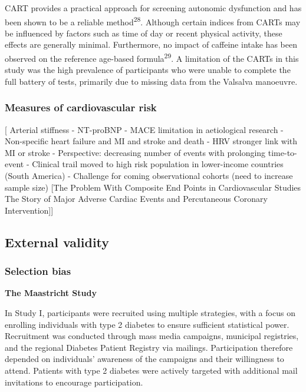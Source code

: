 \documentclass[
  a4paper,
  headsepline=true,
  open=any]{scrbook}
\begin{document}
CART provides a practical approach for screening autonomic dysfunction
and has been shown to be a reliable method\textsuperscript{28}. Although
certain indices from CARTs may be influenced by factors such as time of
day or recent physical activity, these effects are generally minimal.
Furthermore, no impact of caffeine intake has been observed on the
reference age-based formula\textsuperscript{29}. A limitation of the
CARTs in this study was the high prevalence of participants who were
unable to complete the full battery of tests, primarily due to missing
data from the Valsalva manoeuvre.

\hypertarget{measures-of-cardiovascular-risk}{%
\subsubsection{Measures of cardiovascular
risk}\label{measures-of-cardiovascular-risk}}

{[} Arterial stiffness - NT-proBNP - MACE limitation in aetiological
research - Non-specific heart failure and MI and stroke and death - HRV
stronger link with MI or stroke - Perspective: decreasing number of
events with prolonging time-to-event - Clinical trail moved to high risk
population in lower-income countries (South America) - Challenge for
coming observational cohorts (need to increase sample size) {[}The
Problem With Composite End Points in Cardiovascular Studies The Story of
Major Adverse Cardiac Events and Percutaneous Coronary
Intervention{]}{]}

\hypertarget{external-validity}{%
\subsection{External validity}\label{external-validity}}

\hypertarget{selection-bias}{%
\subsubsection{Selection bias}\label{selection-bias}}

\textbf{The Maastricht Study}

In Study I, participants were recruited using multiple strategies, with
a focus on enrolling individuals with type 2 diabetes to ensure
sufficient statistical power. Recruitment was conducted through mass
media campaigns, municipal registries, and the regional Diabetes Patient
Registry via mailings. Participation therefore depended on individuals'
awareness of the campaigns and their willingness to attend. Patients
with type 2 diabetes were actively targeted with additional mail
invitations to encourage participation.
\end{document}
